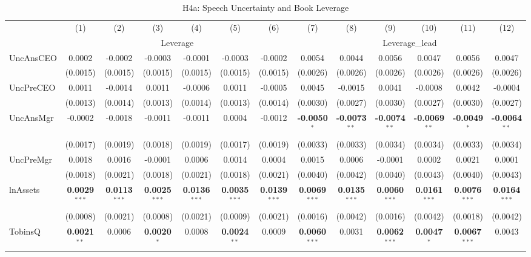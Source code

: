 \documentclass[11pt,a4paper]{article}
\begin{document}
\clearpage
\begin{table}[htbp]
\centering
\caption{H4a: Speech Uncertainty and Book Leverage}
\label{tab:h4a}
\scriptsize
\begin{tabular}{lcccccccccccc}
\toprule
 & (1) & (2) & (3) & (4) & (5) & (6) & (7) & (8) & (9) & (10) & (11) & (12) \\
 & \multicolumn{6}{c}{Leverage} & \multicolumn{6}{c}{Leverage\_lead} \\
\cmidrule(lr){2-7} \cmidrule(lr){8-13}
\midrule
UncAnsCEO & 0.0002 & -0.0002 & -0.0003 & -0.0001 & -0.0003 & -0.0002 & 0.0054 & 0.0044 & 0.0056 & 0.0047 & 0.0056 & 0.0047 \\
 & (0.0015) & (0.0015) & (0.0015) & (0.0015) & (0.0015) & (0.0015) & (0.0026) & (0.0026) & (0.0026) & (0.0026) & (0.0026) & (0.0026) \\
UncPreCEO & 0.0011 & -0.0014 & 0.0011 & -0.0006 & 0.0011 & -0.0005 & 0.0045 & -0.0015 & 0.0041 & -0.0008 & 0.0042 & -0.0004 \\
 & (0.0013) & (0.0014) & (0.0013) & (0.0014) & (0.0013) & (0.0014) & (0.0030) & (0.0027) & (0.0030) & (0.0027) & (0.0030) & (0.0027) \\
UncAnsMgr & -0.0002 & -0.0018 & -0.0011 & -0.0011 & 0.0004 & -0.0012 & \textbf{-0.0050}$^{*}$ & \textbf{-0.0073}$^{**}$ & \textbf{-0.0074}$^{**}$ & \textbf{-0.0069}$^{**}$ & \textbf{-0.0049}$^{*}$ & \textbf{-0.0064}$^{**}$ \\
 & (0.0017) & (0.0019) & (0.0018) & (0.0019) & (0.0017) & (0.0019) & (0.0033) & (0.0033) & (0.0034) & (0.0034) & (0.0033) & (0.0034) \\
UncPreMgr & 0.0018 & 0.0016 & -0.0001 & 0.0006 & 0.0014 & 0.0004 & 0.0015 & 0.0006 & -0.0001 & 0.0002 & 0.0021 & 0.0001 \\
 & (0.0018) & (0.0021) & (0.0018) & (0.0021) & (0.0018) & (0.0021) & (0.0040) & (0.0042) & (0.0040) & (0.0043) & (0.0040) & (0.0043) \\
\midrule
lnAssets & \textbf{0.0029}$^{***}$ & \textbf{0.0113}$^{***}$ & \textbf{0.0025}$^{***}$ & \textbf{0.0136}$^{***}$ & \textbf{0.0035}$^{***}$ & \textbf{0.0139}$^{***}$ & \textbf{0.0069}$^{***}$ & \textbf{0.0135}$^{***}$ & \textbf{0.0060}$^{***}$ & \textbf{0.0161}$^{***}$ & \textbf{0.0076}$^{***}$ & \textbf{0.0164}$^{***}$ \\
 & (0.0008) & (0.0021) & (0.0008) & (0.0021) & (0.0009) & (0.0021) & (0.0016) & (0.0042) & (0.0016) & (0.0042) & (0.0018) & (0.0042) \\
TobinsQ & \textbf{0.0021}$^{**}$ & 0.0006 & \textbf{0.0020}$^{*}$ & 0.0008 & \textbf{0.0024}$^{**}$ & 0.0009 & \textbf{0.0060}$^{***}$ & 0.0031 & \textbf{0.0062}$^{***}$ & \textbf{0.0047}$^{*}$ & \textbf{0.0067}$^{***}$ & 0.0043 \\

\end{tabular}
\end{table}
\end{document}
